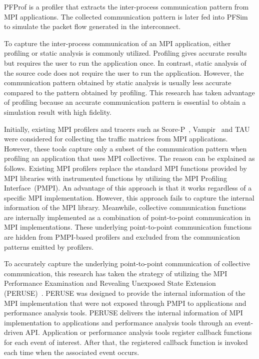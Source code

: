 PFProf is a profiler that extracts the inter-process communication pattern
from MPI applications. The collected communication pattern is later fed into
PFSim to simulate the packet flow generated in the interconnect.

To capture the inter-process communication of an MPI application, either
profiling or static analysis is commonly utilized. Profiling gives accurate
results but requires the user to run the application once. In contrast, static
analysis of the source code does not require the user to run the application.
However, the communication pattern obtained by static analysis is usually less
accurate compared to the pattern obtained by profiling. This research has
taken advantage of profiling because an accurate communication pattern is
essential to obtain a simulation result with high fidelity.

Initially, existing MPI profilers and tracers such as
\mbox{Score-P}~\autocite{Knupfer2012}, Vampir~\autocite{Knupfer2008} and
TAU~\autocite{Shende2006} were considered for collecting the traffic matrices
from MPI applications. However, these tools capture only a subset of the
communication pattern when profiling an application that uses MPI collectives.
The reason can be explained as follows. Existing MPI profilers replace the
standard MPI functions provided by MPI libraries with instrumented functions
by utilizing the MPI Profiling Interface~(PMPI). An advantage of this approach
is that it works regardless of a specific MPI implementation. However, this
approach fails to capture the internal information of the MPI library.
Meanwhile, collective communication functions are internally implemented as a
combination of point-to-point communication in MPI implementations. These
underlying point-to-point communication functions are hidden from PMPI-based
profilers and excluded from the communication patterns emitted by profilers.

To accurately capture the underlying point-to-point communication of
collective communication, this research has taken the strategy of utilizing
the MPI Performance Examination and Revealing Unexposed State Extension
(PERUSE)~\autocite{Jones2006}. PERUSE was designed to provide the internal
information of the MPI implementation that were not exposed through PMPI to
applications and performance analysis tools. PERUSE delivers the internal
information of MPI implementation to applications and performance analysis
tools through an event-driven API\@. Application or performance analysis tools
register callback functions for each event of interest. After that, the
registered callback function is invoked each time when the associated event
occurs.

